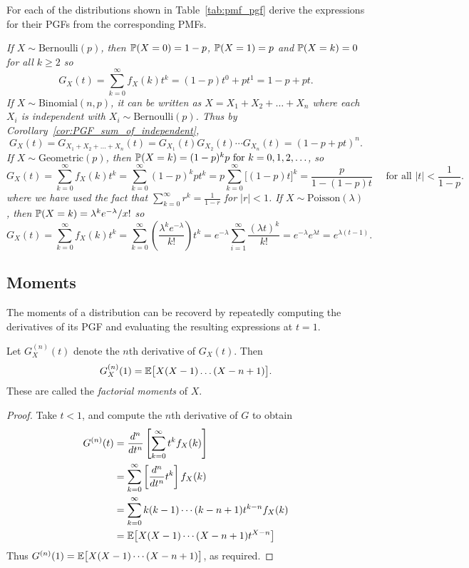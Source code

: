 \begin{exercise}
For each of the distributions shown in Table~\ref{tab:pmf_pgf} derive the expressions for their PGFs from the corresponding PMFs.
\begin{answer}
\ben
\it If $X\sim\text{Bernoulli}(p)$, then $\mathbb{P}(X=0)=1-p$, $\mathbb{P}(X=1)=p$ and $\mathbb{P}(X=k)=0$ for all $k\geq 2$ so
\[
G_X(t)	= \sum_{k=0}^\infty f_X(k) t^k 
		= (1-p)t^0 + pt^1 
		= 1 - p + pt.
\]
\it If $X\sim\text{Binomial}(n,p)$, it can be written as $X=X_1+X_2+\ldots+X_n$ where each $X_i$ is independent with $X_i\sim\text{Bernoulli}(p)$. Thus by Corollary~\ref{cor:PGF_sum_of_independent},
\[
G_X(t)	= G_{X_1+X_2+\ldots+X_n}(t) 
		= G_{X_1}(t)G_{X_2}(t)\cdots G_{X_n}(t) 
		= (1 - p + pt)^n.
\]
\it If $X\sim\text{Geometric}(p)$, then $\mathbb{P}(X=k) = (1-p)^k p \text{ for } k=0,1,2,\ldots$, so 
\[
G_X(t)	= \sum_{k=0}^\infty f_X(k) t^k
		= \sum_{k=0}^\infty (1-p)^k p t^k 
		= p\sum_{k=0}^\infty \big[(1-p)t\big]^k 
		= \frac{p}{1-(1-p)t} \quad\text{ for all } |t|<\frac{1}{1-p}.
\]
where we have used the fact that $\displaystyle\sum_{k=0}^{\infty} r^k = \frac{1}{1-r}$ for $|r|<1$.
\it If $X\sim\text{Poisson}(\lambda)$, then $\mathbb{P}(X=k) = \lambda^k e^{-\lambda}/x!$ so
\[
G_X(t)	= \sum_{k=0}^\infty f_X(k) t^k
		= \sum_{k=0}^{\infty}\left(\frac{\lambda^k e^{-\lambda}}{k!}\right)t^k
		= e^{-\lambda}\sum_{i=1}^\infty \frac{(\lambda t)^k}{k!}
		= e^{-\lambda}e^{\lambda t}
		= e^{\lambda(t-1)}.
\]
\een
\end{answer}
\end{exercise}

\subsection{Moments}

The moments of a distribution can be recoverd by repeatedly computing the derivatives of its PGF and evaluating the resulting expressions at $t=1$.
\begin{theorem}
Let $G_X^{(n)}(t)$ denote the $n$th derivative of $G_X(t)$. Then
\[
G_X^{(n)}(1) = \mathbb{E}\big[X(X-1)\ldots(X-n+1)\big].
\]
These are called the \emph{factorial moments} of $X$.
\begin{proof}
Take $t < 1$, and compute the $n$th derivative of $G$ to obtain
\begin{align*}
G^{(n)}(t) 
	& = \frac{d^n}{dt^n}\left[\sum_{k=0}^{\infty} t^{k} f_X(k)\right] \\
	& = \sum_{k=0}^{\infty} \left[\frac{d^n}{dt^n} t^{k}\right] f_X(k) \\
	& = \sum_{k=0}^{\infty} k(k-1)\cdots(k-n+1)t^{k-n} f_X(k) \\
	& = \mathbb{E}\big[X(X-1)\cdots(X-n+1)t^{X-n} \big]
\end{align*}
Thus $G^{(n)}(1) = \mathbb{E}\big[X(X-1)\cdots(X-n+1)\big]$, as required.
\end{proof}
\end{theorem}

